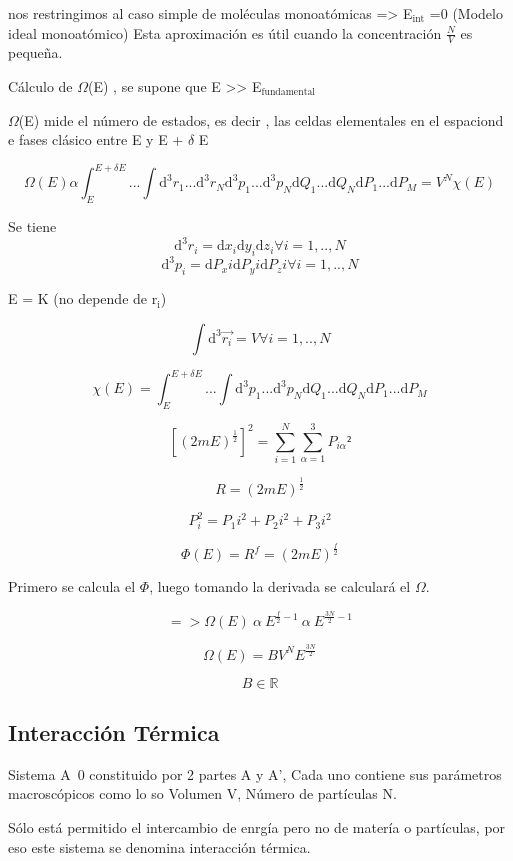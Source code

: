 \documentclass[11pt]{article}
\begin{document}
nos restringimos al caso simple de moléculas monoatómicas => E$_{\text{int}}$ =0
(Modelo ideal monoatómico) Esta aproximación es útil cuando la
concentración $\frac{N}{V}$ es pequeña.

Cálculo de $\Omega$(E) , se supone que E >> E$_{\text{fundamental}}$

$\Omega$(E) mide el número de estados, es decir , las celdas elementales
en el espaciond e fases clásico entre E y E + $\delta$ E

$$ \Omega(E) \alpha \int_E^{E+\delta E} ... \int\mathrm{d}^3 r_1 ...
\mathrm{d}^3 r_N \mathrm{d}^3 p_1 ... \mathrm{d}^3 p_N \mathrm{d} Q_1
... \mathrm{d} Q_N \mathrm{d} P_1 ... \mathrm{d} P_M = V^N \chi(E) $$

Se tiene
$$\mathrm{d}^3 r_i = \mathrm{d}x_i \mathrm{d} y_i \mathrm{d} z_i \forall i = 1,..,N $$
$$\mathrm{d}^3 p_i = \mathrm{d}P_xi \mathrm{d} P_yi \mathrm{d} P_zi \forall i = 1,..,N $$

E = K (no depende de r$_{\text{i}}$)

$$ \int \mathrm{d}^3 \vec{r_i} = V    \forall i = 1,..,N$$

$$ \chi(E) = \int_E^{E+\delta E} ... \int \mathrm{d}^3 p_1 ...
\mathrm{d}^3 p_N \mathrm{d} Q_1 ... \mathrm{d} Q_N \mathrm{d} P_1 ...
\mathrm{d} P_M $$

$$ [(2mE)^{\frac{1}{2}} ]^2 = \sum\limits_{i=1}^N \sum\limits_{\alpha = 1}^3 P_{i\alpha}² $$

$$ R =(2mE)^{\frac{1}{2}}  $$

$$ P_i^2 = P_1i^2 + P_2i^2 + P_3i^2 $$

$$ \Phi(E) = R^f = (2mE)^{\frac{f}{2}} $$


Primero se calcula el $\Phi$, luego tomando la derivada se calculará el $\Omega$.

$$ => \Omega(E)\ \alpha\ E^{\frac{f}{2} -1}\ \alpha\ E^{\frac{3N}{2} -1 } $$

$$ \Omega(E) = B V^N E^{\frac{3N}{2}} $$

$$ B \in \mathbb{R} $$


\subsection{Interacción Térmica}
\label{sec-1-7}
Sistema A 0 constituido por 2 partes A y A', Cada uno contiene sus
parámetros macroscópicos como lo so Volumen V, Número de partículas N.

Sólo está permitido el intercambio de enrgía pero no de matería o
partículas, por eso este sistema se denomina interacción térmica.
\end{document}
